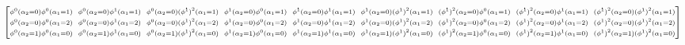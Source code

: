 \begin{landscape}
\begin{align*}
\begin{bmatrix}
        \scriptstyle \phi^0(\alpha_2=0) \phi^0(\alpha_1=1) & \hspace{-4pt} \scriptstyle \phi^0(\alpha_2=0) \phi^1(\alpha_1=1) & \hspace{-4pt} \scriptstyle \phi^0(\alpha_2=0) {(\phi^1)}^2(\alpha_1=1) & \hspace{-4pt} \scriptstyle \phi^1(\alpha_2=0) \phi^0(\alpha_1=1) & \hspace{-4pt} \scriptstyle \phi^1(\alpha_2=0) \phi^1(\alpha_1=1) & \hspace{-4pt} \scriptstyle \phi^1(\alpha_2=0) {(\phi^1)}^2(\alpha_1=1) & \hspace{-4pt} \scriptstyle {(\phi^1)}^2(\alpha_2=0) \phi^0(\alpha_1=1) & \hspace{-4pt} \scriptstyle {(\phi^1)}^2(\alpha_2=0) \phi^1(\alpha_1=1) & \hspace{-4pt} \scriptstyle {(\phi^1)}^2(\alpha_2=0) {(\phi^1)}^2(\alpha_1=1) \\
        \scriptstyle \phi^0(\alpha_2=0) \phi^0(\alpha_1=2) & \hspace{-4pt} \scriptstyle \phi^0(\alpha_2=0) \phi^1(\alpha_1=2) & \hspace{-4pt} \scriptstyle \phi^0(\alpha_2=0) {(\phi^1)}^2(\alpha_1=2) & \hspace{-4pt} \scriptstyle \phi^1(\alpha_2=0) \phi^0(\alpha_1=2) & \hspace{-4pt} \scriptstyle \phi^1(\alpha_2=0) \phi^1(\alpha_1=2) & \hspace{-4pt} \scriptstyle \phi^1(\alpha_2=0) {(\phi^1)}^2(\alpha_1=2) & \hspace{-4pt} \scriptstyle {(\phi^1)}^2(\alpha_2=0) \phi^0(\alpha_1=2) & \hspace{-4pt} \scriptstyle {(\phi^1)}^2(\alpha_2=0) \phi^1(\alpha_1=2) & \hspace{-4pt} \scriptstyle {(\phi^1)}^2(\alpha_2=0) {(\phi^1)}^2(\alpha_1=2) \\ 
        \scriptstyle \phi^0(\alpha_2=1) \phi^0(\alpha_1=0) & \hspace{-4pt} \scriptstyle \phi^0(\alpha_2=1) \phi^1(\alpha_1=0) & \hspace{-4pt} \scriptstyle \phi^0(\alpha_2=1) {(\phi^1)}^2(\alpha_1=0) & \hspace{-4pt} \scriptstyle \phi^1(\alpha_2=1) \phi^0(\alpha_1=0) & \hspace{-4pt} \scriptstyle \phi^1(\alpha_2=1) \phi^1(\alpha_1=0) & \hspace{-4pt} \scriptstyle \phi^1(\alpha_2=1) {(\phi^1)}^2(\alpha_1=0) & \hspace{-4pt} \scriptstyle {(\phi^1)}^2(\alpha_2=1) \phi^0(\alpha_1=0) & \hspace{-4pt} \scriptstyle {(\phi^1)}^2(\alpha_2=1) \phi^1(\alpha_1=0) & \hspace{-4pt} \scriptstyle {(\phi^1)}^2(\alpha_2=1) {(\phi^1)}^2(\alpha_1=0) \\ 

\end{bmatrix}
\end{align*}
\end{landscape}
